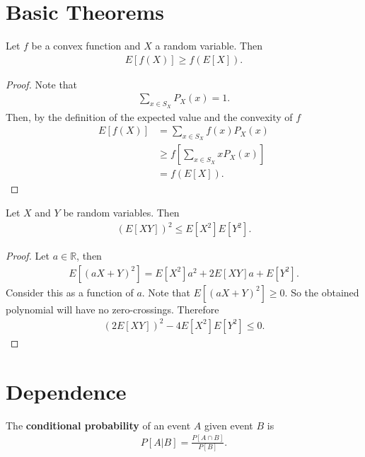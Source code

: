 \documentclass{memoir}
\begin{document}
\section{Basic Theorems}

\begin{theorem}
    Let $f$ be a convex function and $X$ a random variable. Then
    \begin{align*}
        E[f(X)] \ge f(E[X]).
    \end{align*}
\end{theorem}
\begin{proof}
    Note that
    \begin{align*}
        \sum_{x \in S_X} P_X(x) = 1.
    \end{align*}
    Then, by the definition of the expected value and the convexity of $f$
    \begin{align*}
        E[f(X)] &= \sum_{x \in S_X} f(x) P_X(x) \\
        &\ge f\left[\sum_{x \in S_X} x P_X(x) \right] \\
        &=f(E[X]).
    \end{align*}
\end{proof}

\begin{theorem}
    Let $X$ and $Y$ be random variables. Then
    \begin{align*}
        (E[XY])^2 \le E[X^2]E[Y^2].
    \end{align*}
\end{theorem}
\begin{proof}
    Let $a \in \mathbb{R}$, then
    \begin{align*}
        E[(a X + Y)^2] = E[X^2]a^2  + 2E[XY]a + E[Y^2].
    \end{align*}
    Consider this as a function of $a$. Note that  $E[(aX+Y)^2]\ge0$. So the obtained polynomial will have no zero-crossings. Therefore
    \begin{align*}
        (2 E[XY])^2-4 E[X^2] E[Y^2] \le 0.
    \end{align*}
\end{proof}

\section{Dependence}

\begin{definition}
    The \textbf{conditional probability} of an event $A$ given event $B$ is
    \begin{align*}
        P[A|B] = \frac{P[A \cap B]}{P[B]}.
    \end{align*}
\end{definition}
\end{document}
